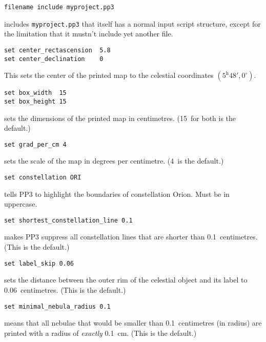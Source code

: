 \documentclass{article}
\newcommand{\subskip}{\vspace{\subskipamount}\pagebreak[3]}
\begin{document}
\begin{multicols*}{3}
\begin{lstlisting}
filename include myproject.pp3
\end{lstlisting}
includes \verb|myproject.pp3| that itself has a normal input script structure,
except for the limitation that it mustn't include yet another file.\subskip

\begin{lstlisting}
set center_rectascension  5.8
set center_declination    0
\end{lstlisting}
This sets the center of the printed map to the celestial coordinates
$(5^{\mathrm h}48',0^\circ)$.

\begin{lstlisting}
set box_width  15
set box_height 15
\end{lstlisting}
sets the dimensions of the printed map in centimetres.  (15~for both is the
default.)

\begin{lstlisting}
set grad_per_cm 4
\end{lstlisting}
sets the scale of the map in degrees per centimetre.  (4~is the default.)\vspace{\bigskipamount}\pagebreak[2]

\begin{lstlisting}
set constellation ORI
\end{lstlisting}
tells PP3 to highlight the boundaries of constellation Orion.  Must be in
uppercase.\vspace{\bigskipamount}\pagebreak[2]

\begin{lstlisting}
set shortest_constellation_line 0.1
\end{lstlisting}
makes PP3 suppress all constellation lines that are shorter than
0.1~centimetres.  (This is the default.)\vspace{\bigskipamount}\pagebreak[2]

\begin{lstlisting}
set label_skip 0.06
\end{lstlisting}
sets the distance between the outer rim of the celestial object and its label
to 0.06~centimetres.  (This is the default.)\vspace{\bigskipamount}\pagebreak[2]

\begin{lstlisting}
set minimal_nebula_radius 0.1
\end{lstlisting}
means that all nebulae that would be smaller than 0.1~centimetres (in radius)
are printed with a radius of \emph{exactly} 0.1~cm.  (This is the
default.)\vspace{\bigskipamount}\pagebreak[2]


\end{multicols*}
\end{document}
